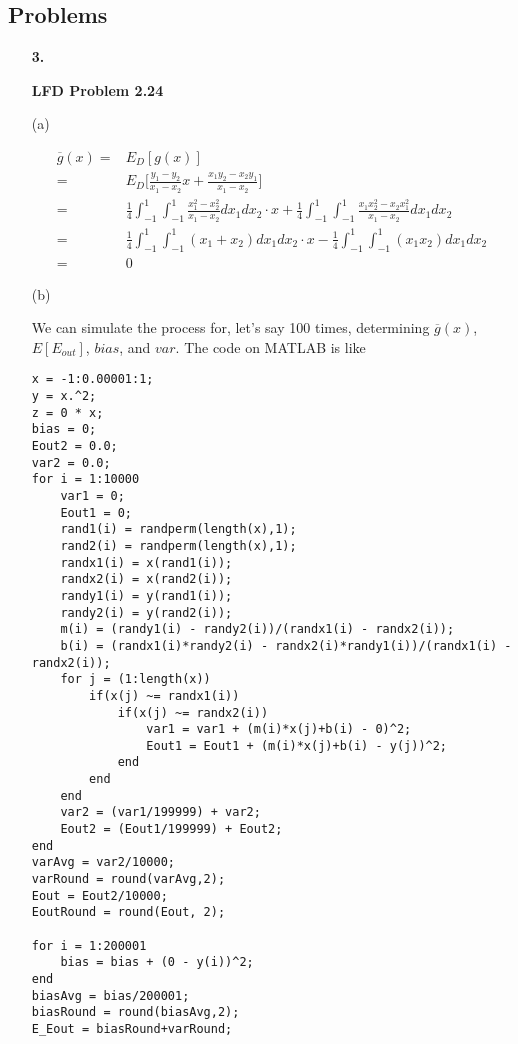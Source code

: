 \documentclass[11pt]{article}
\begin{document}
\pagebreak

\subsection*{Problems}
\begin{enumerate}
\item[\textbf{3.}]

\textbf{LFD Problem 2.24}

(a) 

\begin{equation}
\begin{aligned}
\overline{g}(x) =& E_{D}[g(x)]\\
=& E_{D}\Big[\frac{y_1-y_2}{x_1-x_2}x + \frac{x_1y_2-x_2y_1}{x_1-x_2}\Big]\\
=& \frac{1}{4} \int_{-1}^{1}\int_{-1}^{1}\frac{x_1^2 - x_2^2}{x_1-x_2}dx_1dx_2  \cdot x+ \frac{1}{4} \int_{-1}^{1}\int_{-1}^{1}\frac{x_1x_2^2 - x_2x_1^2}{x_1-x_2}dx_1dx_2\\
=& \frac{1}{4} \int_{-1}^{1}\int_{-1}^{1}(x_1 +  x_2)dx_1dx_2 \cdot x - \frac{1}{4} \int_{-1}^{1}\int_{-1}^{1}(x_1x_2)dx_1dx_2\\
=& 0
\end{aligned}
\end{equation}

(b)

We can simulate the process for, let's say 100 times, determining $\overline{g}(x)$, $E[E_{out}]$, $bias$, and $var$. The code on MATLAB is like 

\begin{lstlisting}
x = -1:0.00001:1;
y = x.^2;
z = 0 * x;
bias = 0;
Eout2 = 0.0;
var2 = 0.0;
for i = 1:10000
    var1 = 0;
    Eout1 = 0;
    rand1(i) = randperm(length(x),1);
    rand2(i) = randperm(length(x),1);
    randx1(i) = x(rand1(i));
    randx2(i) = x(rand2(i));
    randy1(i) = y(rand1(i));
    randy2(i) = y(rand2(i));
    m(i) = (randy1(i) - randy2(i))/(randx1(i) - randx2(i));
    b(i) = (randx1(i)*randy2(i) - randx2(i)*randy1(i))/(randx1(i) - randx2(i));
    for j = (1:length(x))
        if(x(j) ~= randx1(i))
            if(x(j) ~= randx2(i))
                var1 = var1 + (m(i)*x(j)+b(i) - 0)^2;
                Eout1 = Eout1 + (m(i)*x(j)+b(i) - y(j))^2;
            end
        end
    end
    var2 = (var1/199999) + var2;
    Eout2 = (Eout1/199999) + Eout2;
end
varAvg = var2/10000;
varRound = round(varAvg,2);
Eout = Eout2/10000;
EoutRound = round(Eout, 2);

for i = 1:200001
    bias = bias + (0 - y(i))^2;
end
biasAvg = bias/200001;
biasRound = round(biasAvg,2);
E_Eout = biasRound+varRound;


\end{lstlisting}
\end{enumerate}
\end{document}
